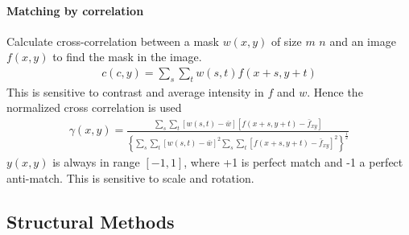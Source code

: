 \paragraph{Matching by correlation}
Calculate cross-correlation between a mask $w(x,y)$ of size $m$ $n$ and an image
$f(x,y)$ to find the mask in the image.
\begin{align*}
	c(c,y) = \sum_s\sum_tw(s,t)f(x+s,y+t)
\end{align*}
This is sensitive to contrast and average intensity in $f$ and $w$.
Hence the normalized cross correlation is used
\begin{align*}
	\gamma(x,y) = \frac{\sum_s\sum_t\left[w(s,t)-\bar{w}\right]\left[f(x+s,y+t)-\bar f_{xy}\right]}
	{
	\left\lbrace 
		\sum_s\sum_t\left[w(s,t)-\bar w\right]^2
		\sum_s\sum_t\left[f(x+s,y+t)-\bar f_{xy}\right]^2
	\right\rbrace^{\frac{1}{2}}
	}
\end{align*}
$y(x,y)$ is always in range $[-1, 1]$, where +1 is perfect match and -1 a perfect anti-match.
This is sensitive to scale and rotation.


\subsection{Structural Methods}

